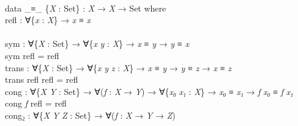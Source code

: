 \documentclass{entcs} \usepackage{prentcsmacro}
\newcommand{\AgdaFontStyle}[1]{\textsf{#1}}
\newcommand{\AgdaBoundFontStyle}[1]{\textit{#1}}
\newcommand{\AgdaKeyword}     [1]
    {\AgdaFontStyle{\textcolor{AgdaKeyword}{#1}}}
\newcommand{\AgdaSymbol}      [1]{\textcolor{AgdaSymbol}{#1}}
\newcommand{\AgdaPrimitiveType}[1]
    {\AgdaFontStyle{\textcolor{AgdaPrimitiveType}{#1}}}
\newcommand{\AgdaBound}    [1]{\AgdaBoundFontStyle{\textcolor{AgdaBound}{#1}}}
\newcommand{\AgdaInductiveConstructor}[1]
    {\AgdaFontStyle{\textcolor{AgdaInductiveConstructor}{#1}}}
\newcommand{\AgdaDatatype} [1]{\AgdaFontStyle{\textcolor{AgdaDatatype}{#1}}}
\newcommand{\AgdaFunction} [1]{\AgdaFontStyle{\textcolor{AgdaFunction}{#1}}}
\newcommand{\AgdaIndent}[1]{\quad}
\newcommand{\AgdaCodeStyle}{\small}
\newenvironment{code}%
{\noindent\AgdaCodeStyle\pboxed}%
{\endpboxed\par\noindent%
\ignorespacesafterend}
\begin{document}
\begin{code}\>\<%
\\
\>\AgdaKeyword{data} \AgdaDatatype{\_≡\_} \AgdaSymbol{\{}\AgdaBound{X} \AgdaSymbol{:} \AgdaPrimitiveType{Set}\AgdaSymbol{\}} \AgdaSymbol{:} \AgdaBound{X} \AgdaSymbol{→} \AgdaBound{X} \AgdaSymbol{→} \AgdaPrimitiveType{Set} \AgdaKeyword{where}\<%
\\
\>[0]\AgdaIndent{2}{}\<[2]%
\>[2]\AgdaInductiveConstructor{refl} \AgdaSymbol{:} \AgdaSymbol{∀\{}\AgdaBound{x} \AgdaSymbol{:} \AgdaBound{X}\AgdaSymbol{\}} \AgdaSymbol{→} \AgdaBound{x} \AgdaDatatype{≡} \AgdaBound{x}\<%
\\
%
\\
\>\AgdaFunction{sym} \AgdaSymbol{:} \AgdaSymbol{∀\{}\AgdaBound{X} \AgdaSymbol{:} \AgdaPrimitiveType{Set}\AgdaSymbol{\}} \AgdaSymbol{→} \AgdaSymbol{∀\{}\AgdaBound{x} \AgdaBound{y} \AgdaSymbol{:} \AgdaBound{X}\AgdaSymbol{\}} \AgdaSymbol{→} \AgdaBound{x} \AgdaDatatype{≡} \AgdaBound{y} \AgdaSymbol{→} \AgdaBound{y} \AgdaDatatype{≡} \AgdaBound{x}\<%
\\
\>\AgdaFunction{sym} \AgdaInductiveConstructor{refl} \AgdaSymbol{=} \AgdaInductiveConstructor{refl}\<%
\\
\>\AgdaFunction{trans} \AgdaSymbol{:} \AgdaSymbol{∀\{}\AgdaBound{X} \AgdaSymbol{:} \AgdaPrimitiveType{Set}\AgdaSymbol{\}} \AgdaSymbol{→} \AgdaSymbol{∀\{}\AgdaBound{x} \AgdaBound{y} \AgdaBound{z} \AgdaSymbol{:} \AgdaBound{X}\AgdaSymbol{\}} \AgdaSymbol{→} \AgdaBound{x} \AgdaDatatype{≡} \AgdaBound{y} \AgdaSymbol{→} \AgdaBound{y} \AgdaDatatype{≡} \AgdaBound{z} \AgdaSymbol{→} \AgdaBound{x} \AgdaDatatype{≡} \AgdaBound{z}\<%
\\
\>\AgdaFunction{trans} \AgdaInductiveConstructor{refl} \AgdaInductiveConstructor{refl} \AgdaSymbol{=} \AgdaInductiveConstructor{refl}\<%
\\
\>\AgdaFunction{cong} \AgdaSymbol{:} \AgdaSymbol{∀\{}\AgdaBound{X} \AgdaBound{Y} \AgdaSymbol{:} \AgdaPrimitiveType{Set}\AgdaSymbol{\}} \AgdaSymbol{→} \AgdaSymbol{∀(}\AgdaBound{f} \AgdaSymbol{:} \AgdaBound{X} \AgdaSymbol{→} \AgdaBound{Y}\AgdaSymbol{)} \AgdaSymbol{→} \AgdaSymbol{∀\{}\AgdaBound{x₀} \AgdaBound{x₁} \AgdaSymbol{:} \AgdaBound{X}\AgdaSymbol{\}} \AgdaSymbol{→} \AgdaBound{x₀} \AgdaDatatype{≡} \AgdaBound{x₁} \AgdaSymbol{→} \AgdaBound{f} \AgdaBound{x₀} \AgdaDatatype{≡} \AgdaBound{f} \AgdaBound{x₁}\<%
\\
\>\AgdaFunction{cong} \AgdaBound{f} \AgdaInductiveConstructor{refl} \AgdaSymbol{=} \AgdaInductiveConstructor{refl}\<%
\\
\>\AgdaFunction{cong₂} \AgdaSymbol{:} \AgdaSymbol{∀\{}\AgdaBound{X} \AgdaBound{Y} \AgdaBound{Z} \AgdaSymbol{:} \AgdaPrimitiveType{Set}\AgdaSymbol{\}} \AgdaSymbol{→} \AgdaSymbol{∀(}\AgdaBound{f} \AgdaSymbol{:} \AgdaBound{X} \AgdaSymbol{→} \AgdaBound{Y} \AgdaSymbol{→} \AgdaBound{Z}\AgdaSymbol{)} \<[42]%

\end{code}
\end{document}
